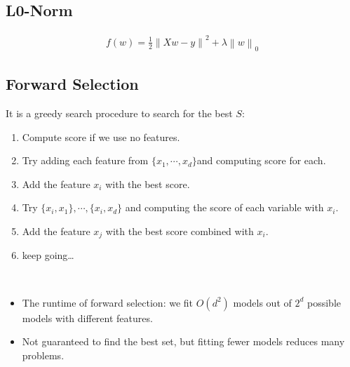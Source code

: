 \subsection{L0-Norm} \label{sec:}

\begin{align*}
    f(w) = \frac{1}{2} \left\| Xw-y \right\|_{}^{2} + \lambda \left\| w \right\|_{0}
\end{align*}


\subsection{Forward Selection} \label{sec:}
It is a greedy search procedure to search for the best $S$:

\begin{enumerate}
    \item Compute score if we use no features.
    \item Try adding each feature from $\{ x_1, \cdots , x_d \}$and computing score for each.
    \item Add the feature $x_i$ with the best score.
    \item Try $\{ x_i, x_1 \},\cdots ,\{ x_i, x_d \}$ and computing the score of each variable with $x_i$.
    \item Add the feature $x_j$ with the best score combined with $x_i$.
    \item keep going\dots
\end{enumerate}

\begin{remark} ~
\begin{itemize}
    \item The runtime of forward selection: we fit $O(d^{2})$ models out of $2^{d}$ possible models with different features.
    \item Not guaranteed to find the best set, but fitting fewer models reduces many problems.
\end{itemize}
\end{remark}
